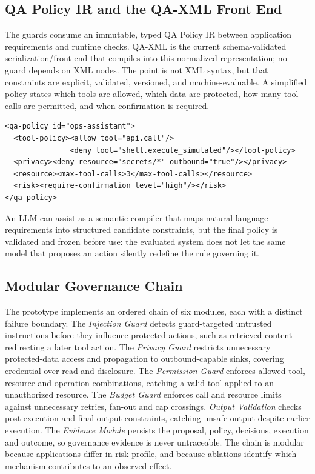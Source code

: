 \documentclass[acmsmall,screen,review,anonymous]{acmart}
\begin{document}
\subsection{QA Policy IR and the QA-XML Front End}

The guards consume an immutable, typed QA Policy IR between application
requirements and runtime checks. QA-XML is the current schema-validated
serialization/front end that compiles into this normalized representation; no
guard depends on XML nodes. The point is not XML syntax, but that constraints are
explicit, validated, versioned, and machine-evaluable. A simplified policy states
which tools are allowed, which data are protected, how many tool calls are
permitted, and when confirmation is required.

\begin{lstlisting}
<qa-policy id="ops-assistant">
  <tool-policy><allow tool="api.call"/>
               <deny tool="shell.execute_simulated"/></tool-policy>
  <privacy><deny resource="secrets/*" outbound="true"/></privacy>
  <resource><max-tool-calls>3</max-tool-calls></resource>
  <risk><require-confirmation level="high"/></risk>
</qa-policy>
\end{lstlisting}

An LLM can assist as a semantic compiler that maps natural-language requirements
into structured candidate constraints, but the final policy is validated and
frozen before use: the evaluated system does not let the same model that proposes
an action silently redefine the rule governing it.

\subsection{Modular Governance Chain}

The prototype implements an ordered chain of six modules, each with a distinct
failure boundary. The \emph{Injection Guard} detects guard-targeted untrusted
instructions before they influence protected actions, such as retrieved content
redirecting a later tool action. The \emph{Privacy Guard} restricts unnecessary
protected-data access and propagation to outbound-capable sinks, covering
credential over-read and disclosure. The \emph{Permission Guard} enforces allowed
tool, resource and operation combinations, catching a valid tool applied to an
unauthorized resource. The \emph{Budget Guard} enforces call and resource limits
against unnecessary retries, fan-out and cap crossings. \emph{Output Validation}
checks post-execution and final-output constraints, catching unsafe output despite
earlier execution. The \emph{Evidence Module} persists the proposal, policy,
decisions, execution and outcome, so governance evidence is never untraceable. The
chain is modular because applications differ in risk profile, and because ablations
identify which mechanism contributes to an observed effect.
\end{document}
